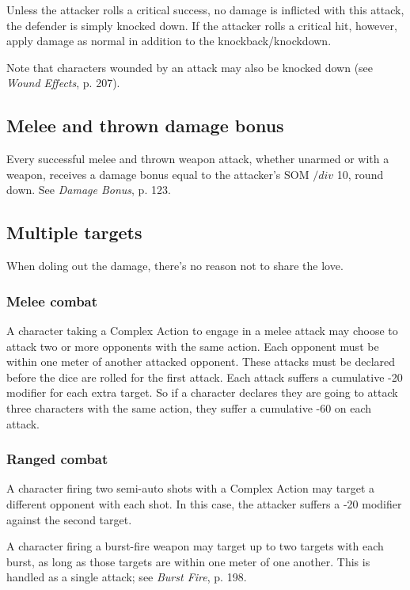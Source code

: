 Unless the attacker rolls a critical success, no damage is inflicted with this attack, the defender is simply knocked down. If the attacker rolls a critical hit, however, apply damage as normal in addition to the knockback/knockdown.

Note that characters wounded by an attack may also be knocked down (see \emph{Wound Effects}, p. 207).


\subsection{Melee and thrown damage bonus}
\label{sec:melee-thrown-damage-bonus}

Every successful melee and thrown weapon attack, whether unarmed or with a weapon, receives a damage bonus equal to the attacker’s SOM $/div$ 10, round down. See \emph{Damage Bonus}, p. 123.


\subsection{Multiple targets}
\label{sec:multiple-targets}

When doling out the damage, there’s no reason not to share the love.

\subsubsection{Melee combat}

A character taking a Complex Action to engage in a melee attack may choose to attack two or more opponents with the same action. Each opponent must be within one meter of another attacked opponent. These attacks must be declared before the dice are rolled for the first attack. Each attack suffers a cumulative -20 modifier for each extra target. So if a character declares they are going to attack three characters with the same action, they suffer a cumulative -60 on each attack.

\subsubsection{Ranged combat}

A character firing two semi-auto shots with a Complex Action may target a different opponent with each shot. In this case, the attacker suffers a -20 modifier against the second target.

A character firing a burst-fire weapon may target up to two targets with each burst, as long as those targets are within one meter of one another. This is handled as a single attack; see \emph{Burst Fire}, p. 198.

